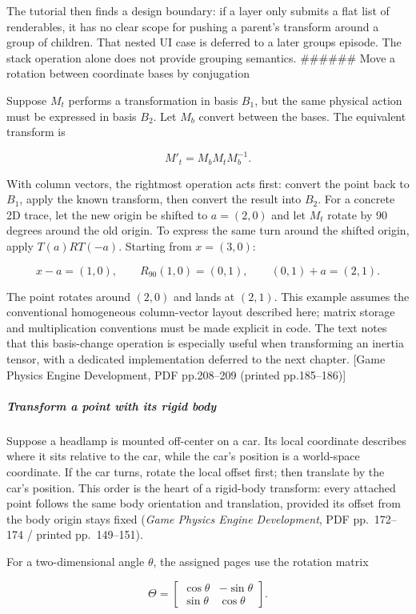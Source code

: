 The tutorial then finds a design boundary: if a layer only submits a flat list of renderables, it has no clear scope for pushing a parent's transform around a group of children. That nested UI case is deferred to a later groups episode. The stack operation alone does not provide grouping semantics. \#\#\#\#\#\# Move a rotation between coordinate bases by conjugation

Suppose \(M_t\) performs a transformation in basis \(B_1\), but the same physical action must be expressed in basis \(B_2\). Let \(M_b\) convert between the bases. The equivalent transform is

\[
M'_t=M_bM_tM_b^{-1}.
\]

With column vectors, the rightmost operation acts first: convert the point back to \(B_1\), apply the known transform, then convert the result into \(B_2\). For a concrete 2D trace, let the new origin be shifted to \(a=(2,0)\) and let \(M_t\) rotate by 90 degrees around the old origin. To express the same turn around the shifted origin, apply \(T(a)RT(-a)\). Starting from \(x=(3,0)\):

\[
x-a=(1,0),\qquad R_{90}(1,0)=(0,1),\qquad (0,1)+a=(2,1).
\]

The point rotates around \((2,0)\) and lands at \((2,1)\). This example assumes the conventional homogeneous column-vector layout described here; matrix storage and multiplication conventions must be made explicit in code. The text notes that this basis-change operation is especially useful when transforming an inertia tensor, with a dedicated implementation deferred to the next chapter. {[}Game Physics Engine Development, PDF pp.208--209 (printed pp.185--186){]}

\subparagraph{Transform a point with its rigid body}\label{transform-a-point-with-its-rigid-body}

Suppose a headlamp is mounted off-center on a car. Its local coordinate describes where it sits relative to the car, while the car's position is a world-space coordinate. If the car turns, rotate the local offset first; then translate by the car's position. This order is the heart of a rigid-body transform: every attached point follows the same body orientation and translation, provided its offset from the body origin stays fixed (\emph{Game Physics Engine Development}, PDF pp.~172--174 / printed pp.~149--151).

For a two-dimensional angle \(\theta\), the assigned pages use the rotation matrix

\[
\Theta = \begin{bmatrix}
\cos\theta & -\sin\theta \\
\sin\theta & \cos\theta
\end{bmatrix}.
\]

